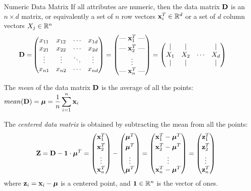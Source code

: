 \begin{frame}{Numeric Data Matrix}
  \small
  If all attributes are numeric, then the data matrix
$\mathbf{D}$ is an $n \times d$ matrix,
 or equivalently a set of $n$ row vectors 
$\mathbf{x}_i^T
\in {\mathord{\mathbb R}}^d$ 
or a set of $d$ column vectors 
$X_{j} \in {\mathord{\mathbb R}}^n$
\begin{align*}
        \bD = &
        \matr{%
            x_{11} & x_{12} & \cdots & x_{1d}\\
            x_{21} & x_{22} & \cdots & x_{2d}\\
            \vdots & \vdots & \ddots & \vdots\\
            x_{n1} & x_{n2} & \cdots & x_{nd}
        }
        = \matr{\mbox{---} \; \bx_1^T \; \mbox{---}\\[0.3em]
                \mbox{---} \; \bx_2^T \; \mbox{---}\\[0.3em]
                \vdots\\
                \mbox{---} \; \bx_n^T \; \mbox{---}}
        = \matr{
            | & | & & |\\
            X_1 & X_2 & \cdots & X_d\\
            | & | & & |
            }
\end{align*}

The {\em mean} of the data matrix $\mathbf{D}$ is the average of all the points:
    $\displaystyle mean(\mathbf{D}) = {\bm \mu} = {1 \over n} \sum_{i=1}^n \mathbf{x}_i$

The {\em centered
data matrix} is obtained by
subtracting the mean from all the points:
\begin{align}
\bZ = \bD - \bone \cdot \bmu^T
= \matr{\bx_1^T\\[0.3em] \bx_2^T\\[0.3em] \vdots \\ \bx_n^T} -
  \matr{\bmu^T\\[0.3em] \bmu^T \\[0.3em] \vdots \\\bmu^T}
        = \matr{\bx_1^T - \bmu^T\\[0.3em] \bx_2^T - \bmu^T \\[0.3em] \vdots \\
        \bx_n^T-\bmu^T}
        = \matr{\bz_1^T \\[0.3em] \bz_2^T \\[0.3em] \vdots \\\bz_n^T}
    \label{eq:eda:data:centered}
\end{align}
where $\mathbf{z}_i = \mathbf{x}_i - {\bm \mu}$ is a centered point, 
and $\mathbf{1} \in {\mathord{\mathbb R}}^n$
is the vector of ones.
\end{frame}

